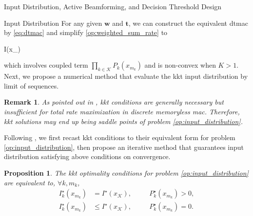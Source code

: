 \documentclass[journal]{IEEEtran}
\newtheorem{proposition}{Proposition}
\newtheorem{remark}{Remark}
\begin{document}
\begin{section}{Input Distribution, Active Beamforming, and Decision Threshold Design}
	\begin{subsection}{Input Distribution}
		For any given $\boldsymbol{w}$ and $\boldsymbol{t}$, we can construct the equivalent \gls{dtmac} by \eqref{eq:dtmac} and simplify \eqref{op:weighted_sum_rate} to
		\begin{maxi!}
			{}{I(x_{})}{\label{op:input_distribution}}{}
			\addConstraint{\eqref{co:sum_probability},\eqref{co:nonnegative_probability},}
		\end{maxi!}
		which involves coupled term $\prod_{k \in \mathcal{K}} P_k(x_{m_k})$ and is non-convex when $K > 1$. Next, we propose a numerical method that evaluate the \gls{kkt} input distribution by limit of sequences.
		\begin{remark}
			As pointed out in \cite{Buhler2011}, \gls{kkt} conditions are generally necessary but insufficient for total rate maximization in discrete memoryless \gls{mac}. Therefore, \gls{kkt} solutions may end up being saddle points of problem \eqref{op:input_distribution}.
		\end{remark}
		Following \cite{Rezaeian2004}, we first recast \gls{kkt} conditions to their equivalent form for problem \eqref{op:input_distribution}, then propose an iterative method that guarantees input distribution satisfying above conditions on convergence.
		\begin{proposition}
			The \gls{kkt} optimality conditions for problem \eqref{op:input_distribution} are equivalent to, $\forall k,m_k$,
			\begin{subequations}
				\label{eq:input_kkt_condition}
				\begin{alignat}{2}
					I_k^\star(x_{m_k}) & = I^\star(x_{\mathcal{K}}), \quad   &  & P_k^\star(x_{m_k}) > 0,\label{eq:probable_states} \\
					I_k^\star(x_{m_k}) & \le I^\star(x_{\mathcal{K}}), \quad &  & P_k^\star(x_{m_k}) = 0.\label{eq:dropped_states}
				\end{alignat}
			\end{subequations}
			\label{pr:input_kkt_condition}
		\end{proposition}


\end{subsection}
\end{section}
\end{document}
